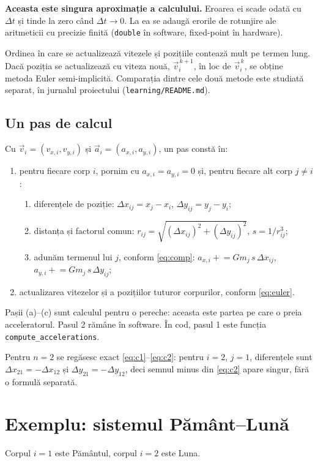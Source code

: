 \documentclass[11pt,a4paper]{article}
\newcommand{\vv}{\vec v}
\newcommand{\va}{\vec a}
\begin{document}
\textbf{Aceasta este singura aproximație a calculului.} Eroarea ei scade odată cu $\Delta t$ și tinde la zero când $\Delta t \to 0$. La ea se adaugă erorile de rotunjire ale aritmeticii cu precizie finită (\texttt{double} în software, fixed-point în hardware).

Ordinea în care se actualizează vitezele și pozițiile contează mult pe termen lung. Dacă poziția se actualizează cu viteza nouă, $\vv_i^{\,k+1}$, în loc de $\vv_i^{\,k}$, se obține metoda Euler semi-implicită. Comparația dintre cele două metode este studiată separat, în jurnalul proiectului (\texttt{learning/README.md}).

\subsection*{Un pas de calcul}
Cu $\vv_i = (v_{x,i}, v_{y,i})$ și $\va_i = (a_{x,i}, a_{y,i})$, un pas constă în:
\begin{enumerate}
  \item pentru fiecare corp $i$, pornim cu $a_{x,i} = a_{y,i} = 0$ și, pentru fiecare alt corp $j \neq i$:
  \begin{enumerate}[label=(\alph*)]
    \item diferențele de poziție: $\Delta x_{ij} = x_j - x_i$, \; $\Delta y_{ij} = y_j - y_i$;
    \item distanța și factorul comun: $r_{ij} = \sqrt{(\Delta x_{ij})^2 + (\Delta y_{ij})^2}$, \; $s = 1/r_{ij}^3$;
    \item adunăm termenul lui $j$, conform \eqref{eq:comp}: $a_{x,i} \mathrel{+}= G m_j\,s\,\Delta x_{ij}$, \; $a_{y,i} \mathrel{+}= G m_j\,s\,\Delta y_{ij}$;
  \end{enumerate}
  \item actualizarea vitezelor și a pozițiilor tuturor corpurilor, conform \eqref{eq:euler}.
\end{enumerate}
Pașii (a)--(c) sunt calculul pentru o pereche: aceasta este partea pe care o preia acceleratorul. Pasul 2 rămâne în software. În cod, pasul 1 este funcția \texttt{compute\_accelerations}.

Pentru $n = 2$ se regăsesc exact \eqref{eq:c1}--\eqref{eq:c2}: pentru $i = 2$, $j = 1$, diferențele sunt $\Delta x_{21} = -\Delta x_{12}$ și $\Delta y_{21} = -\Delta y_{12}$, deci semnul minus din \eqref{eq:c2} apare singur, fără o formulă separată.

\section{Exemplu: sistemul Pământ--Lună}\label{sec:exemplu}
Corpul $i = 1$ este Pământul, corpul $i = 2$ este Luna.
\end{document}
